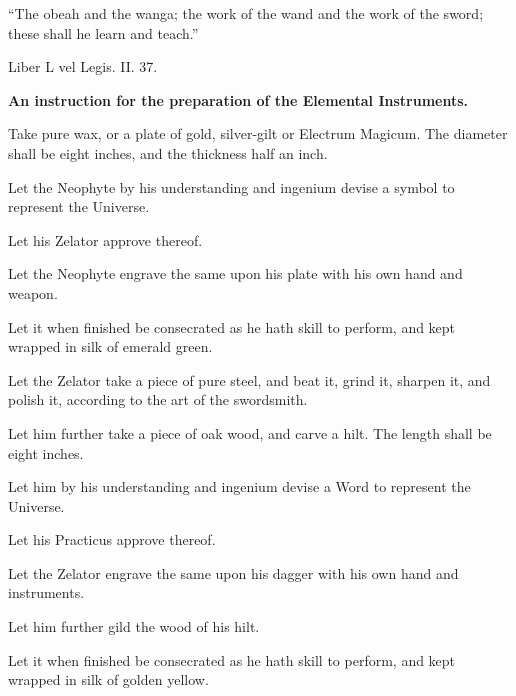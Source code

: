 

\epigraph{\enquote{The obeah and the wanga; the work of the wand and the work of the sword; these shall he learn and teach.}}{Liber L vel Legis. II. 37.}

\textbf{An instruction for the preparation of the Elemental Instruments.}


\begin{description}
\item Take pure wax, or a plate of gold, silver-gilt or Electrum Magicum. The diameter shall be eight inches, and the thickness half an inch.
\item Let the Neophyte by his understanding and ingenium devise a symbol to represent the Universe.
\item Let his Zelator approve thereof.
\item Let the Neophyte engrave the same upon his plate with his own hand and weapon.
\item Let it when finished be consecrated as he hath skill to perform, and kept wrapped in silk of emerald green.
\end{description}


\begin{description}
\item Let the Zelator take a piece of pure steel, and beat it, grind it, sharpen it, and polish it, according to the art of the swordsmith.
\item Let him further take a piece of oak wood, and carve a hilt. The length shall be eight inches.
\item Let him by his understanding and ingenium devise a Word to represent the Universe.
\item Let his Practicus approve thereof.
\item Let the Zelator engrave the same upon his dagger with his own hand and instruments.
\item Let him further gild the wood of his hilt.
\item Let it when finished be consecrated as he hath skill to perform, and kept wrapped in silk of golden yellow.
\end{description}

